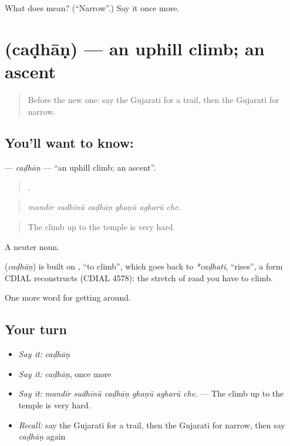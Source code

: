 \begin{tcolorbox}[breakable,colback=teal!4,colframe=teal!35!black,title={Before you move on}]
What does  mean? (\textquotedblleft{}Narrow\textquotedblright{}.) Say it once more.
\end{tcolorbox}
\section[\texorpdfstring{\gu{ચઢાણ} (caḍhāṇ)}{ચઢાણ (caḍhāṇ)}]{ (caḍhāṇ) — an uphill climb; an ascent}

\label{lesson:GU-C404-cadhan}



\begin{quote}
Before the new one: say the Gujarati for a trail, then the Gujarati for narrow.
\end{quote}

\subsection*{You'll want to know: }
\textbf{} — \emph{caḍhāṇ} — \textquotedblleft{}an uphill climb; an ascent\textquotedblright{}.

\begin{quote}
     .
\end{quote}

\begin{quote}
\emph{mandir sudhīnũ caḍhāṇ ghaṇũ agharũ che.}
\end{quote}

\begin{quote}
The climb up to the temple is very hard.
\end{quote}

A neuter noun.

\begin{cousinweb}
\textbf{} (\emph{caḍhāṇ}) is built on , \textquotedblleft{}to climb\textquotedblright{}, which goes back to \emph{*caḍhati}, \textquotedblleft{}rises\textquotedblright{}, a form CDIAL reconstructs (CDIAL 4578): the stretch of road you have to climb.
\end{cousinweb}

\begin{grammarlens}[title={What you've built}]
One more word for getting around.
\end{grammarlens}

\subsection*{Your turn}
\begin{itemize}
\raggedright
  \item \emph{Say it:} \emph{caḍhāṇ}
  \item \emph{Say it:} \emph{caḍhāṇ}, once more
  \item \emph{Say it:} \emph{mandir sudhīnũ caḍhāṇ ghaṇũ agharũ che.} — The climb up to the temple is very hard.
  \item \emph{Recall:} say the Gujarati for a trail, then the Gujarati for narrow, then say \emph{caḍhāṇ} again
\end{itemize}

